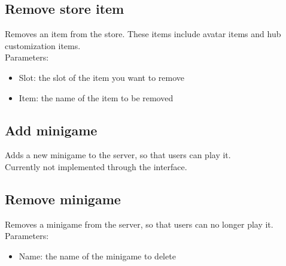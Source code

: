 \documentclass[a4paper,12pt]{article}
\begin{document}
\subsection*{Remove store item}
Removes an item from the store. These items include avatar items and hub customization items.\\
Parameters:
\begin{itemize}
	\setlength\itemsep{0em}
	\item Slot: the slot of the item you want to remove
	\item Item: the name of the item  to be removed
\end{itemize}	

\subsection*{Add minigame}
Adds a new minigame to the server, so that users can play it.\\
Currently not implemented through the interface.\\

\subsection*{Remove minigame}
Removes a minigame from the server, so that users can no longer play it.
Parameters:
\begin{itemize}
	\setlength\itemsep{0em}
	\item Name: the name of the minigame to delete
\end{itemize}		
\end{document}
